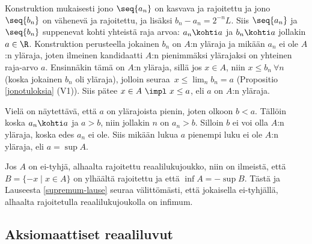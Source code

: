 Konstruktion mukaisesti jono $\seq{a_n}$ on kasvava ja rajoitettu ja jono $\seq{b_n}$ on
vähenevä ja rajoitettu, ja lisäksi $b_n-a_n=2^{-n}L$. Siis $\seq{a_n}$ ja $\seq{b_n}$
suppenevat kohti yhteistä raja arvoa: $a_n \kohti a$ ja $b_n \kohti a$ jollakin $a\in\R$.
Konstruktion perusteella jokainen $b_n$ on $A$:n yläraja ja mikään $a_n$ ei ole $A$:n yläraja,
joten ilmeinen kandidaatti $A$:n pienimmäksi ylärajaksi on yhteinen raja-arvo $a$. Ensinnäkin
tämä on $A$:n yläraja, sillä jos $x \in A$, niin $x \le b_n\ \forall n$ (koska jokainen $b_n$ 
oli yläraja), jolloin seuraa $\,x \le \lim_n b_n=a$ (Propositio \ref{jonotuloksia} (V1)).
Siis pätee $x \in A\ \impl\ x \le a$, eli $a$ on $A$:n yläraja.

Vielä on näytettävä, että $a$ on ylärajoista pienin, joten olkoon $b<a$. Tällöin koska 
$a_n \kohti a$ ja $a>b$, niin jollakin $n$ on $a_n>b$. Silloin $b$ ei voi olla $A$:n yläraja, 
koska edes $a_n$ ei ole. Siis mikään lukua $a$ pienempi luku ei ole $A$:n yläraja, eli 
$a=\sup A$. \loppu

Jos $A$ on ei-tyhjä, alhaalta rajoitettu reaalilukujoukko, niin on ilmeistä, että 
$B = \{-x \mid x \in A\}$ on ylhäältä rajoitettu ja että $\inf A = - \sup B$. Tästä ja 
Lauseesta \ref{supremum-lause} seuraa välittömästi, että jokaisella ei-tyhjällä, alhaalta 
rajoitetulla reaalilukujoukolla on infimum.

\subsection{Aksiomaattiset reaaliluvut}

